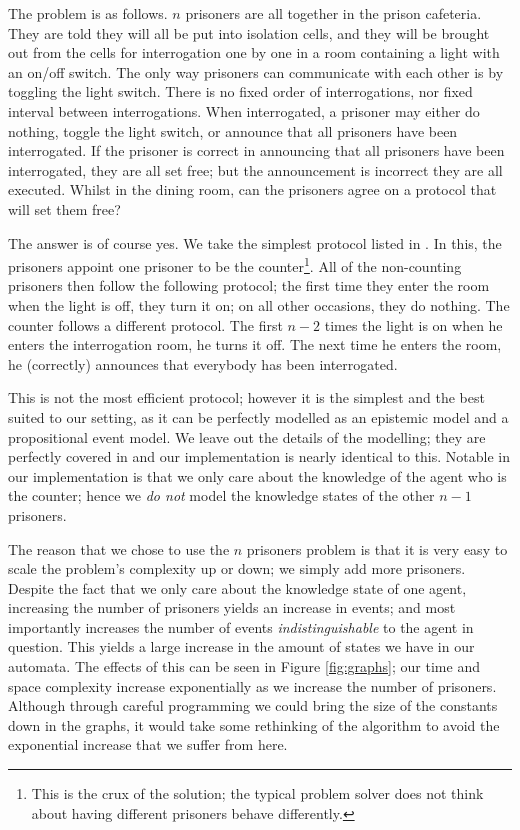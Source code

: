 \documentclass[10pt, a4paper]{report}
\begin{document}
The problem is as follows. $n$ prisoners are all together in the prison
cafeteria. They are told they will all be put into isolation cells, and they
will be brought out from the cells for interrogation one by one in a room
containing a light with an on/off switch. The only way prisoners can communicate
with each other is by toggling the light switch. There is no fixed order of
interrogations, nor fixed interval between interrogations. When interrogated, a
prisoner may either do nothing, toggle the light switch, or announce that all
prisoners have been interrogated. If the prisoner is correct in announcing that
all prisoners have been interrogated, they are all set free; but the
announcement is incorrect they are all executed. Whilst in the dining room, can
the prisoners agree on a protocol that will set them free? 

The answer is of course yes. We take the simplest protocol listed in
\cite{Prisoners}. In this, the prisoners appoint one prisoner to be the
counter\footnote{This is the crux of the solution; the typical problem solver
  does not think about having different prisoners behave differently.}. All of
the non-counting prisoners then follow the following protocol; the first time
they enter the room when the light is off, they turn it on; on all other
occasions, they do nothing. The counter follows a different protocol. The first
$n - 2$ times the light is on when he enters the interrogation room, he turns it
off. The next time he enters the room, he (correctly) announces that everybody
has been interrogated.

This is not the most efficient protocol; however it is the simplest and the best
suited to our setting, as it can be perfectly modelled as an epistemic model and
a propositional event model. We leave out the details of the modelling; they are
perfectly covered in \cite{Prisoners} and our implementation is nearly identical
to this. Notable in our implementation is that we only care about the knowledge
of the agent who is the counter; hence we \emph{do not} model the knowledge
states of the other $n - 1$ prisoners. 

The reason that we chose to use the $n$ prisoners problem is that it is very easy
to scale the problem's complexity up or down; we simply add more prisoners.
Despite the fact that we only care about the knowledge state of one agent,
increasing the number of prisoners yields an increase in events; and most
importantly increases the number of events \emph{indistinguishable} to the agent
in question. This yields a large increase in the amount of states we have in our
automata. The effects of this can be seen in Figure \ref{fig:graphs}; our time
and space complexity increase exponentially as we increase the number of
prisoners. Although through careful programming we could bring the size of the
constants down in the graphs, it would take some rethinking of the algorithm to
avoid the exponential increase that we suffer from here.
\end{document}
